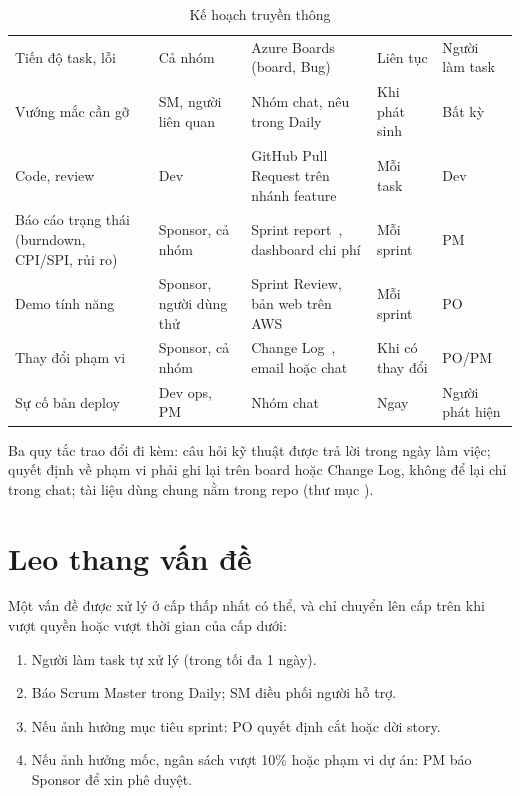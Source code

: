 \documentclass[12pt,a4paper]{report}
\begin{document}
\begin{table}[htbp]
  \centering
  \caption{Kế hoạch truyền thông}
  \label{tab:comms}
  \small
  \setlength{\tabcolsep}{4pt}
  \begin{tabularx}{\linewidth}{@{}P{3.3cm}P{2.6cm}LP{2.1cm}P{2.1cm}@{}}
    \toprule
     &  &  &  &  \\
    \midrule
    Tiến độ task, lỗi & Cả nhóm & Azure Boards (board, Bug) & Liên tục & Người làm task \\
    Vướng mắc cần gỡ & SM, người liên quan & Nhóm chat, nêu trong Daily & Khi phát sinh & Bất kỳ \\
    Code, review & Dev & GitHub Pull Request trên nhánh feature & Mỗi task & Dev \\
    Báo cáo trạng thái (burndown, CPI/SPI, rủi ro) & Sponsor, cả nhóm & Sprint report~\cite{mcr}, dashboard chi phí
      & Mỗi sprint & PM \\
    Demo tính năng & Sponsor, người dùng thử & Sprint Review, bản web trên AWS & Mỗi sprint & PO \\
    Thay đổi phạm vi & Sponsor, cả nhóm & Change Log~\cite{mcr}, email hoặc chat & Khi có thay đổi & PO/PM \\
    Sự cố bản deploy & Dev ops, PM & Nhóm chat & Ngay & Người phát hiện \\
    \bottomrule
  \end{tabularx}
\end{table}

Ba quy tắc trao đổi đi kèm: câu hỏi kỹ thuật được trả lời trong ngày làm việc; quyết định về phạm vi phải ghi lại
trên board hoặc Change Log, không để lại chỉ trong chat; tài liệu dùng chung nằm trong repo (thư mục
).

\section{Leo thang vấn đề}

Một vấn đề được xử lý ở cấp thấp nhất có thể, và chỉ chuyển lên cấp trên khi vượt quyền hoặc vượt thời gian của
cấp dưới:
\begin{enumerate}
  \item Người làm task tự xử lý (trong tối đa 1 ngày).
  \item Báo Scrum Master trong Daily; SM điều phối người hỗ trợ.
  \item Nếu ảnh hưởng mục tiêu sprint: PO quyết định cắt hoặc dời story.
  \item Nếu ảnh hưởng mốc, ngân sách vượt 10\% hoặc phạm vi dự án: PM báo Sponsor để xin phê duyệt.
\end{enumerate}
\end{document}
